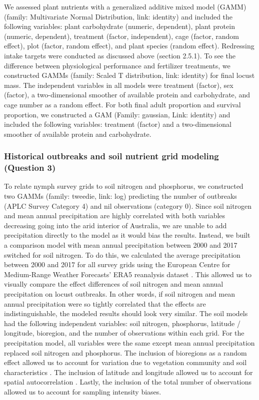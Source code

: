 \documentclass[
]{article}
\begin{document}
We assessed plant nutrients with a generalized additive mixed model
(GAMM) (family: Multivariate Normal Distribution, link: identity) and
included the following variables: plant carbohydrate (numeric,
dependent), plant protein (numeric, dependent), treatment (factor,
independent), cage (factor, random effect), plot (factor, random
effect), and plant species (random effect). Redressing intake targets
were conducted as discussed above (section 2.5.1). To see the difference
between physiological performance and fertilizer treatments, we
constructed GAMMs (family: Scaled T distribution, link: identity) for
final locust mass. The independent variables in all models were
treatment (factor), sex (factor), a two-dimensional smoother of
available protein and carbohydrate, and cage number as a random effect.
For both final adult proportion and survival proportion, we constructed
a GAM (Family: gaussian, Link: identity) and included the following
variables: treatment (factor) and a two-dimensional smoother of
available protein and carbohydrate.

\subsubsection{Historical outbreaks and soil nutrient grid modeling
(Question
3)}\label{historical-outbreaks-and-soil-nutrient-grid-modeling-question-3}

To relate nymph survey grids to soil nitrogen and phosphorus, we
constructed two GAMMs (family: tweedie, link: log) predicting the number
of outbreaks (APLC Survey Category 4) and nil observations (category 0).
Since soil nitrogen and mean annual precipitation are highly correlated
with both variables decreasing going into the arid interior of
Australia, we are unable to add precipitation directly to the model as
it would bias the results. Instead, we built a comparison model with
mean annual precipitation between 2000 and 2017 switched for soil
nitrogen. To do this, we calculated the average precipitation between
2000 and 2017 for all survey grids using the European Centre for
Medium-Range Weather Forecasts' ERA5 reanalysis dataset
\citep{munoz-sabater_era5-land_2021}. This allowed us to visually
compare the effect differences of soil nitrogen and mean annual
precipitation on locust outbreaks. In other words, if soil nitrogen and
mean annual precipitation were so tightly correlated that the effects
are indistinguishable, the modeled results should look very similar. The
soil models had the following independent variables: soil nitrogen,
phosphorus, latitude / longitude, bioregion, and the number of
observations within each grid. For the precipitation model, all
variables were the same except mean annual precipitation replaced soil
nitrogen and phosphorus. The inclusion of bioregions as a random effect
allowed us to account for variation due to vegetation community and soil
characteristics \citep{lawton_seeing_2022}. The inclusion of latitude
and longitude allowed us to account for spatial autocorrelation
\citep{clayton_spatial_1993}. Lastly, the inclusion of the total number
of observations allowed us to account for sampling intensity biases.
\end{document}
